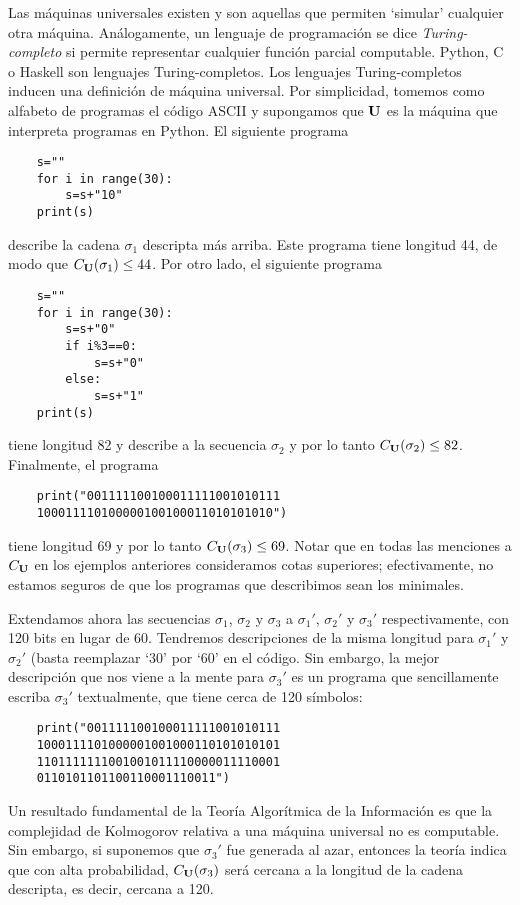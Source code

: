 Las máquinas universales existen y son aquellas que permiten `simular' cualquier otra máquina. Análogamente, un lenguaje de programación se dice {\em Turing-completo} si permite representar cualquier función parcial computable. Python, C o Haskell son lenguajes Turing-completos. Los lenguajes Turing-completos inducen una definición de máquina universal. Por simplicidad, tomemos como alfabeto de programas el código ASCII y supongamos que ${\bf U}$ es la máquina que interpreta programas en Python. El siguiente programa 
\begin{verbatim}
    s=""
    for i in range(30):
        s=s+"10"
    print(s)
\end{verbatim}
describe la cadena $\sigma_1$ descripta más arriba. Este programa tiene longitud 44, de modo que $C_{{\bf U}}(\sigma_1)\leq 44$. Por otro lado, el siguiente programa
\begin{verbatim}
    s=""
    for i in range(30):
        s=s+"0"
        if i%3==0:
            s=s+"0"
        else:
            s=s+"1"
    print(s)
\end{verbatim}
tiene longitud 82 y describe a la secuencia $\sigma_2$ y por lo tanto $C_{{\bf U}}(\sigma_2)\leq 82$. Finalmente, el programa
\begin{verbatim}
    print("001111100100011111001010111
    100011110100000100100011010101010")
\end{verbatim}
tiene longitud 69 y por lo tanto $C_{{\bf U}}(\sigma_3)\leq 69$. Notar que en todas las menciones a $C_{{\bf U}}$ en los ejemplos anteriores consideramos cotas superiores; efectivamente, no estamos seguros de que los programas que describimos sean los minimales.

Extendamos ahora las secuencias $\sigma_1$, $\sigma_2$ y $\sigma_3$ a $\sigma_1'$, $\sigma_2'$ y $\sigma_3'$ respectivamente, con 120 bits en lugar de 60. Tendremos descripciones de la misma longitud para $\sigma_1'$ y $\sigma_2'$ (basta reemplazar `30' por `60' en el código. Sin embargo, la mejor descripción que nos viene a la mente para $\sigma_3'$ es un programa que sencillamente escriba $\sigma_3'$ textualmente, que tiene cerca de 120 símbolos:
\begin{verbatim}
    print("001111100100011111001010111
    1000111101000001001000110101010101
    1101111111001001011110000011110001
    0110101101100110001110011")
\end{verbatim}
Un resultado fundamental de la Teoría Algorítmica de la Información es que la complejidad de Kolmogorov relativa a una máquina universal no es computable. Sin embargo, si suponemos que $\sigma_3'$ fue generada al azar, entonces la teoría indica que con alta probabilidad, $C_{{\bf U}}(\sigma_3)$ será cercana a la longitud de la cadena descripta, es decir, cercana a 120.

